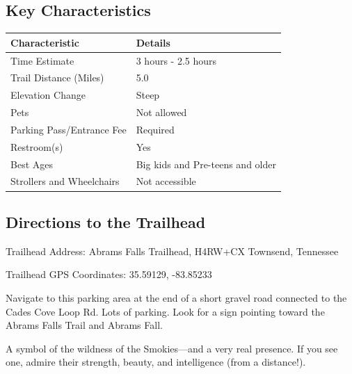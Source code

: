 \documentclass[
  letterpaper,
  DIV=11,
  numbers=noendperiod]{scrreprt}
\begin{document}
\subsection{Key Characteristics}\label{key-characteristics-27}

\begin{longtable}[]{@{}ll@{}}
\toprule\noalign{}
\textbf{Characteristic} & \textbf{Details} \\
\midrule\noalign{}
\endhead
\bottomrule\noalign{}
\endlastfoot
Time Estimate & 3 hours - 2.5 hours \\
Trail Distance (Miles) & 5.0 \\
Elevation Change & Steep \\
Pets & Not allowed \\
Parking Pass/Entrance Fee & Required \\
Restroom(s) & Yes \\
Best Ages & Big kids and Pre-teens and older \\
Strollers and Wheelchairs & Not accessible \\
\end{longtable}

\subsection{Directions to the
Trailhead}\label{directions-to-the-trailhead-26}

Trailhead Address: Abrams Falls Trailhead, H4RW+CX Townsend, Tennessee

Trailhead GPS Coordinates: 35.59129, -83.85233

Navigate to this parking area at the end of a short gravel road
connected to the Cades Cove Loop Rd. Lots of parking. Look for a sign
pointing toward the Abrams Falls Trail and Abrams Fall.

\begin{tcolorbox}[enhanced jigsaw, arc=.35mm, titlerule=0mm, toprule=.15mm, opacityback=0, colframe=quarto-callout-note-color-frame, coltitle=black, bottomrule=.15mm, toptitle=1mm, leftrule=.75mm, left=2mm, breakable, bottomtitle=1mm, colbacktitle=quarto-callout-note-color!10!white, title={Note}, rightrule=.15mm, opacitybacktitle=0.6, colback=white]

A symbol of the wildness of the Smokies---and a very real presence. If
you see one, admire their strength, beauty, and intelligence (from a
distance!).

\end{tcolorbox}
\end{document}
